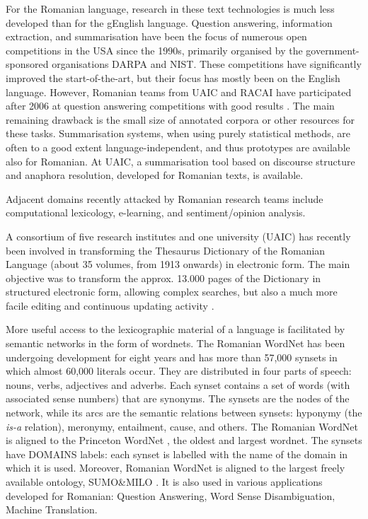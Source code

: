 \begin{multicols}{2}

For the Romanian language, research in these text technologies is much less developed than for the gEnglish language. Question answering, information extraction, and summarisation have been the focus of numerous open competitions in the USA since the 1990s, primarily organised by the government-sponsored organisations DARPA and NIST. These competitions have significantly improved the start-of-the-art, but their focus has mostly been on the English language. However, Romanian teams from UAIC and RACAI have participated after 2006 at question answering competitions with good results \cite{qa}. The main remaining drawback is the small size of annotated corpora or other resources for these tasks. Summarisation systems, when using purely statistical methods, are often to a good extent language-independent, and thus prototypes are available also for Romanian. At UAIC, a summarisation tool based on discourse structure and anaphora resolution, developed for Romanian texts, is available.

Adjacent domains recently attacked by Romanian research teams include computational lexicology, e-learning, and sentiment/opinion analysis. 

A consortium of five research institutes and one university (UAIC) has recently been involved in transforming the Thesaurus Dictionary of the Romanian Language (about 35 volumes, from 1913 onwards) in electronic form. The main objective was to transform the approx. 13.000 pages of the Dictionary in structured electronic form, allowing complex searches, but also a much more facile editing and continuous updating activity \cite{cristea3}.

More useful access to the lexicographic material of a language is facilitated by semantic networks in the form of wordnets. The Romanian WordNet has been undergoing development for eight years and has more than 57,000 synsets in which almost 60,000 literals occur. They are distributed in four parts of speech: nouns, verbs, adjectives and adverbs. Each synset contains a set of words (with associated sense numbers) that are synonyms. The synsets are the nodes of the network, while its arcs are the semantic relations between synsets: hyponymy (the \textit{is-a} relation), meronymy, entailment, cause, and others. The Romanian WordNet is aligned to the Princeton WordNet \cite{wnURL}, the oldest and largest wordnet. The synsets have DOMAINS labels: each synset is labelled with the name of the domain in which it is used. Moreover, Romanian WordNet is aligned to the largest freely available ontology, SUMO\&MILO \cite{ro_wnURL}. It is also used in various applications developed for Romanian: Question Answering, Word Sense Disambiguation, Machine Translation.


\end{multicols}
